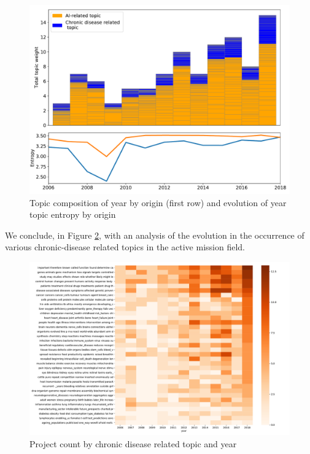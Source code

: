 \documentclass[11pt]{article}
\begin{document}
\begin{figure}[!ht]
    \centering
    \includegraphics[width=\textwidth]{figures/fig_20_topic_trends.pdf}
    \caption{Topic composition of year by origin (first row) and evolution of year topic entropy by origin}
    \label{fig:topic_evol}
\end{figure}

We conclude, in Figure \ref{fig:cd_importance}, with an analysis of the evolution in the occurrence of various chronic-disease related topics in the active mission field. 

\begin{figure}[!ht]
    \centering
    \includegraphics[width=\textwidth]{figures/fig_21_heatmap.pdf}
    \caption{Project count by chronic disease related topic and year}
    \label{fig:cd_importance}
\end{figure}
\end{document}
